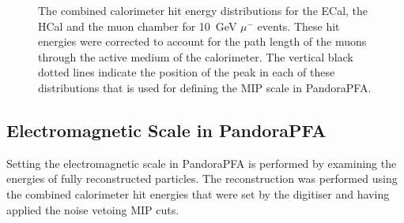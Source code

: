 \begin{figure}[h!]
\caption[The combined calorimeter hit energy distributions for \protect{} the ECal, \protect{} the HCal and \protect{} the muon chamber for 10~GeV $\mu^{-}$ events.  These hit energies were corrected to account for the path length of the muons through the active medium of the calorimeter.  The vertical black dotted lines indicate the position of the peak in each of these distributions that is used for defining the MIP scale in PandoraPFA.]{The combined calorimeter hit energy distributions for \protect{} the ECal, \protect{} the HCal and \protect{} the muon chamber for 10~GeV $\mu^{-}$ events.  These hit energies were corrected to account for the path length of the muons through the active medium of the calorimeter.  The vertical black dotted lines indicate the position of the peak in each of these distributions that is used for defining the MIP scale in PandoraPFA.}
\label{fig:pandoramip}
\end{figure}


\subsection{Electromagnetic Scale in PandoraPFA}
\label{sec:emscalesetting}
Setting the electromagnetic scale in PandoraPFA is performed by examining the energies of fully reconstructed particles.  The reconstruction was performed using the combined calorimeter hit energies that were set by the digitiser and having applied the noise vetoing MIP cuts.  

